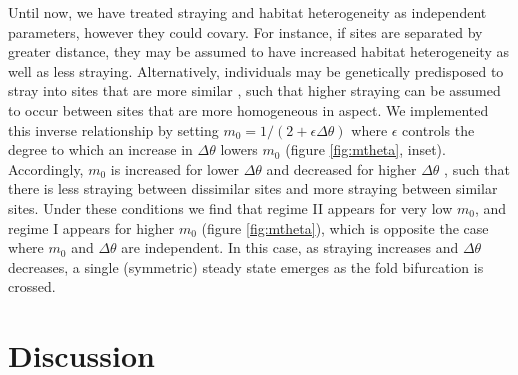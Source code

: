 \documentclass{revtex4}
\begin{document}
Until now, we have treated straying and habitat heterogeneity as independent parameters, however they could covary.
For instance, if sites are separated by greater distance, they may be assumed to have increased habitat heterogeneity as well as less straying.
Alternatively, individuals may be genetically predisposed to stray into sites that are more similar \citep{Peterson:2014gy,Lin:2008kl}, such that higher straying can be assumed to occur between sites that are more homogeneous in aspect.
We implemented this inverse relationship by setting $m_0 = 1/(2+\epsilon\Delta\theta)$ where $\epsilon$ controls the degree to which an increase in $\Delta\theta$ lowers $m_0$ (figure \ref{fig:mtheta}, inset).
Accordingly, $m_0$ is increased for lower $\Delta\theta$ and decreased for higher $\Delta\theta$ , such that there is less straying between dissimilar sites and more straying between similar sites.
Under these conditions we find that regime II appears for very low $m_0$, and regime I appears for higher $m_0$ (figure \ref{fig:mtheta}), which is opposite the case where $m_0$ and $\Delta\theta$ are independent. %
In this case, as straying increases and $\Delta\theta$ decreases, a single (symmetric) steady state emerges as the fold bifurcation is crossed.  %





\section{Discussion}
\end{document}
